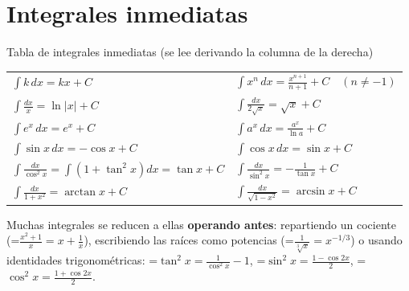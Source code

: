 \documentclass[11pt,a4paper]{article}
\newcommand{\fmm}[1]{\setbox0=\hbox{$#1$}\ifdim\wd0>\linewidth\fmdisp{#1}\else\mbox{\box0}\fi}
\newcommand{\fmdisp}[1]{\[\setbox2=\hbox{$\displaystyle #1$}\ifdim\wd2>\linewidth\resizebox{\linewidth}{!}{\box2}\else\box2\fi\]}
\begin{document}
\section{Integrales inmediatas}\hypertarget{sec2}{}

\begin{fmdef}{Tabla de integrales inmediatas (se lee derivando la columna de la derecha)}
\begin{center}\renewcommand{\arraystretch}{1.5}\small\begin{tabularx}{\linewidth}{>{\raggedright\arraybackslash}p{7.2cm}>{\raggedright\arraybackslash}X}\toprule
$\displaystyle\int k\,dx=kx+C$ & $\displaystyle\int x^n\,dx=\frac{x^{n+1}}{n+1}+C\quad(n\neq-1)$\\[3pt]
$\displaystyle\int\frac{dx}{x}=\ln|x|+C$ & $\displaystyle\int\frac{dx}{2\sqrt x}=\sqrt x+C$\\[3pt]
$\displaystyle\int e^x\,dx=e^x+C$ & $\displaystyle\int a^x\,dx=\frac{a^x}{\ln a}+C$\\[3pt]
$\displaystyle\int\sin x\,dx=-\cos x+C$ & $\displaystyle\int\cos x\,dx=\sin x+C$\\[5pt]
$\displaystyle\int\frac{dx}{\cos^2x}=\int\left(1+\tan^2x\right)dx=\tan x+C$ & $\displaystyle\int\frac{dx}{\sin^2x}=-\frac{1}{\tan x}+C$\\[5pt]
$\displaystyle\int\frac{dx}{1+x^2}=\arctan x+C$ & $\displaystyle\int\frac{dx}{\sqrt{1-x^2}}=\arcsin x+C$\\[5pt]
\bottomrule\end{tabularx}\end{center}

Muchas integrales se reducen a ellas \textbf{operando antes}: repartiendo un cociente (\fmm{\frac{x^2+1}{x}=x+\frac1x}), escribiendo las raíces como potencias (\fmm{\frac{1}{\sqrt[3]x}=x^{-1/3}}) o usando identidades trigonométricas: \fmm{\tan^2x=\frac{1}{\cos^2x}-1}, \fmm{\sin^2x=\frac{1-\cos2x}{2}}, \fmm{\cos^2x=\frac{1+\cos2x}{2}}.
\end{fmdef}
\end{document}
